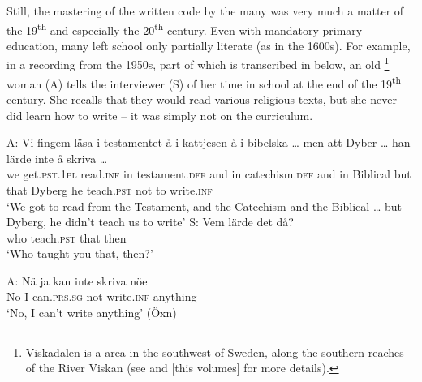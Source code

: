 \documentclass[output=paper]{langscibook}
\begin{document}
Still, the mastering of the written code by the many was very much a matter of the 19\textsuperscript{th} and especially the 20\textsuperscript{th} century. Even with mandatory primary education, many left school only partially literate (as in the 1600s). For example, in a recording from the 1950s, part of which is transcribed in  below, an old \footnote{Viskadalen is a  area in the southwest of Sweden, along the southern reaches of the River Viskan (see \citealt{Petzell2017,Petzell2018} and \citeyear{chapters/07} [this volumes] for more details).} woman (A) tells the interviewer (S) of her time in school at the end of the 19\textsuperscript{th} century. She recalls that they would read various religious texts, but she never did learn how to write – it was simply not on the curriculum.


\ea \label{ex:intro:4}
\ea
\gll A:    Vi   fingem                  läsa             i     testamentet            å     i     kattjesen å     i     bibelska … men att   Dyber … han lärde inte   å   {skriva …}\\
     {}     we   get.\textsc{pst.1pl}  read.\textsc{inf} in   testament.\textsc{def} and   in   catechism.\textsc{def} and   in   Biblical   {}       but   that Dyberg   {}    he   teach.\textsc{pst} not   to   write\textsc{.inf}\\
    \glt `We got to read from the Testament, and the Catechism and the Biblical … but Dyberg, he didn’t teach us to write’
\ex
\gll S:     Vem   lärde       det   då?\\
     {}  who    teach.\textsc{pst}  that  then\\
    \glt `Who taught you that, then?’

\gll A:   Nä   ja   kan           inte     skriva     nöe\\
  {} No  I  can\textsc{.prs.sg}   not  write.\textsc{inf}   anything  \\
    \glt `No, I can’t write anything’ (Öxn)
\z
\z
\end{document}
